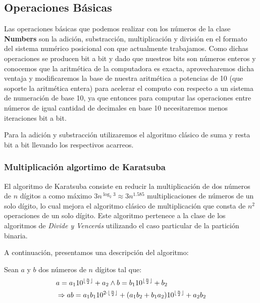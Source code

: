 \documentclass[a4paper,10pt,twocolumn]{article}
\begin{document}
  
\subsection{Operaciones Básicas}\label{sub:basic operations}

	Las operaciones básicas que podemos realizar con los números de la clase \textbf{Numbers} son la adición, substracción, multiplicación y división en el formato del sistema numérico posicional con que actualmente trabajamos. Como dichas operaciones se producen bit a bit y dado que nuestros bits son números enteros y conocemos que la aritmética de la computadora es exacta, aprovecharemos dicha ventaja y modificaremos la base de nuestra aritmética a potencias de 10 (que soporte la aritmética entera) para acelerar el computo con respecto a un sistema de numeración de base 10, ya que entonces para computar las operaciones entre números de igual cantidad de decimales en base 10 necesitaremos menos iteraciones bit a bit.
  
	Para la adición y substracción utilizaremos el algoritmo clásico de suma y resta bit a bit llevando los respectivos acarreos.


\subsubsection{Multiplicación algortimo de Karatsuba}\label{sub:multiplication}
	El algoritmo de Karatsuba consiste en reducir la multiplicación de dos números de $n$ dígitos a como máximo 
	$3n^{\log_2 3}\approx 3n^{1.585}$ multiplicaciones de números de un solo dígito, lo cual mejora el algoritmo clásico de multiplicación que consta de $n^2$ operaciones de un solo dígito. Este algoritmo pertenece a la clase de los algoritmos de \emph{Divide y Vencerás} utilizando el caso particular de la partición binaria.
	
	A continuación, presentamos una descripción del algoritmo:
	
	Sean $a$ y $b$ dos números de $n$ dígitos tal que:
		\begin{equation}
			\begin{split}
				&a=a_1 10^{\lfloor {n\over 2}\rfloor} + a_2 \wedge b=b_1 10^{\lfloor {n\over 2}\rfloor} + b_2	\\	
				&\Rightarrow ab=a_1 b_1 10^{2\cdot\lfloor {n\over 2}\rfloor}+(a_1 b_2+b_1 a_2 )10^{\lfloor {n\over 2}\rfloor}+a_2 b_2
			\end{split}
		\end{equation}			
			
\end{document}
